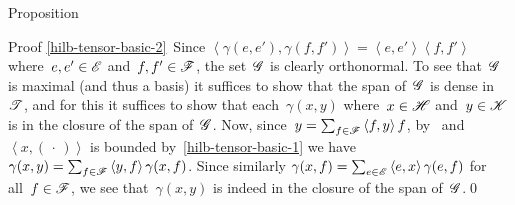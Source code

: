 \documentclass[a]{subfiles}
\begin{document}
\begin{parsec}
\begin{point}{Proposition}
\begin{point}{Proof}
\ref{hilb-tensor-basic-2}\ 
Since $\left<\gamma(e,e'),\gamma(f,f')\right>
=\left<e,e'\right>\left<f,f'\right>$
where~$e,e'\in \mathscr{E}$
and~$f,f'\in\mathscr{F}$,
the set~$\mathscr{G}$ is clearly orthonormal.
To see that~$\mathscr{G}$ is maximal (and thus a basis)
it suffices
to show that the span of~$\mathscr{G}$ 
is dense in~$\mathscr{T}$,
and for this it suffices
to show that each~$\gamma(x,y)$
where~$x\in\mathscr{H}$ and~$y\in\mathscr{K}$
is in the closure of the span of~$\mathscr{G}$.
Now,
since~$y=\sum_{f\in\mathscr{F}}\left<f,y\right> f$,
by~
and~$\left<x,(\,\cdot\,)\right>$
is bounded by~\ref{hilb-tensor-basic-1}
we have~$\gamma(x,y)= \sum_{f\in\mathscr{F}}
\left<y,f\right>\gamma(x,f)$.
Since similarly $\gamma(x,f)=\sum_{e\in\mathscr{E}} \left<e,x\right>\gamma(e,f)$ 
for all~$f\in\mathscr{F}$,
we see that~$\gamma(x,y)$
is indeed in the closure of the span of~$\mathscr{G}$.\qed
\end{point}
\end{point}
\end{parsec}
\end{document}
